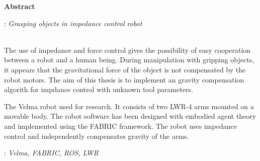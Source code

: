\vspace*{\baselineskip}
\begin{center}
	{\large\bfseries Abstract}\par\bigskip
\end{center}
: {\itshape Grasping objects in impedance control robot}
\\\\
{ 
	The use of impedance and force control gives the possibility of easy cooperation between a robot and a human being. During manipulation with gripping objects, it appears that the gravitational force of the object is not compensated by the robot motors. The aim of this thesis is to implement an gravity compensation algorith for impdance control with unknown tool parameters.
	
	The Velma robot used for research. It consists of two LWR-4 arms mounted on a movable body. The robot software has been designed with embodied agent theory and implemented using the FABRIC framework. The robot uses impedance control and independently compensates gravity of the arms.
}\par
\vspace*{1\baselineskip}
: {\itshape Velma, FABRIC, ROS, LWR}

\clearpage\mbox{}\newpage



\clearpage\mbox{}\newpage




